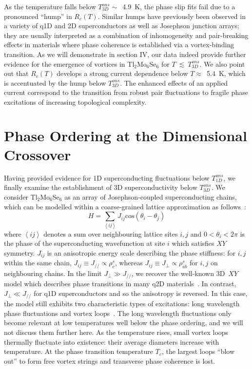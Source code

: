 \documentclass[prb,twocolumn,showpacs,preprintnumbers,amsmath,amssymb,floatfix,groupedaddress,superscriptaddress,aps,10pt]{revtex4-1}
\newcommand{\Tl}{Tl$_2$Mo$_6$Se$_6$}
\begin{document}
{As the temperature falls below $T_{3D}^{ons}\sim$~4.9~K, the phase slip fits fail due to a pronounced ``hump'' in $R_c(T)$.  Similar humps have previously been observed in a variety of q1D and 2D superconductors as well as Josephson junction arrays; they are usually interpreted as a combination of inhomogeneity and pair-breaking effects in materials where phase coherence is established via a vortex-binding transition\cite{Ansermet2016,Resnick1981,Humps1,Humps2}. As we will demonstrate in section IV, our data indeed provide further evidence for the emergence of vortices in {\Tl} for $T~\lesssim~T_{3D}^{ons}$. We also point out that $R_c(T)$ develops a strong current dependence below $T\approx$~5.4~K, which is accentuated by the hump below $T_{3D}^{ons}$. The enhanced effects of an applied current correspond to the transition from robust pair fluctuations to fragile phase excitations of increasing topological complexity.  

\section{Phase Ordering at the Dimensional Crossover}
Having provided evidence for 1D superconducting fluctuations below $T_{1D}^{ons}$, we finally examine the establishment of 3D superconductivity below $T_{3D}^{ons}$.  We consider {\Tl} as an array of Josephson-coupled superconducting chains, which can be modelled within a coarse-grained lattice approximation as follows~\cite{Benfatto2007}: 
\begin{equation} \label{3DXYHam}
H=\sum_{\left\langle ij\right\rangle}J_{ij}\mathrm{cos}(\theta_i-\theta_j)
\end{equation}
where $\left\langle ij\right\rangle$ denotes a sum over neighbouring lattice sites $i,j$ and $0\!<\!\theta_i\!<\!2\pi$ is the phase of the superconducting wavefunction at site $i$ which satisfies $XY$ symmetry.  $J_{ij}$ is an anisotropic energy scale describing the phase stiffness: for $i,j$ within the same chain, $J_{ij}\!\equiv\!J_{/\!/}\!\propto\!\rho^s_c$, whereas $J_{ij}\!\equiv\!J_{\perp}\!\propto\!\rho^s_{ab}$ for $i,j$ on neighbouring chains.  In the limit $J_{\perp}\!\gg\!J_{/\!/}$, we recover the well-known 3D~$XY$ model which describes phase transitions in many q2D materials~\cite{Chattopadhyay1994}.  In contrast, $J_{\perp}\!\ll\!J_{/\!/}$ for q1D superconductors and so the anisotropy is reversed.  In this case, the model still exhibits two characteristic types of excitations: long wavelength phase fluctuations and vortex loops~\cite{Shenoy1995}.  The long wavelength fluctuations only become relevant at low temperatures well below the phase ordering, and we will not discuss them further here.  As the temperature rises, small vortex loops thermally fluctuate into existence: their average diameters increase with temperature.  At the phase transition temperature $T_c$, the largest loops ``blow out'' to form free vortex strings and transverse phase coherence is lost.  

}
\end{document}
